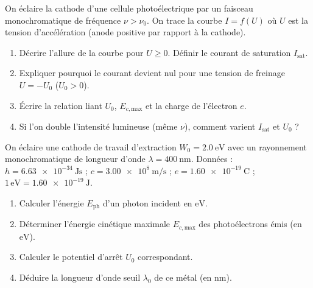 \documentclass[11pt]{article}
\begin{document}
\begin{exercice}[Caractéristique $I = f(U)$ d'une cellule photoélectrique]
On éclaire la cathode d'une cellule photoélectrique par un faisceau monochromatique de fréquence $\nu > \nu_0$. On trace la courbe $I = f(U)$ où $U$ est la tension d'accélération (anode positive par rapport à la cathode).
\begin{enumerate}
    \item Décrire l'allure de la courbe pour $U \ge 0$. Définir le courant de saturation $I_{\text{sat}}$.
    \item Expliquer pourquoi le courant devient nul pour une tension de freinage $U = -U_0$ ($U_0 > 0$).
    \item Écrire la relation liant $U_0$, $E_{c,\text{max}}$ et la charge de l'électron $e$.
    \item Si l'on double l'intensité lumineuse (même $\nu$), comment varient $I_{\text{sat}}$ et $U_0$ ?
\end{enumerate}
\end{exercice}

\begin{exercice}
On éclaire une cathode de travail d'extraction $W_0 = \SI{2,0}{\electronvolt}$ avec un rayonnement monochromatique de longueur d'onde $\lambda = \SI{400}{\nano\meter}$.
Données : $h = \SI{6,63e-34}{\joule\second}$ ; $c = \SI{3,00e8}{\meter\per\second}$ ; $e = \SI{1,60e-19}{\coulomb}$ ; $1\,\text{eV} = \SI{1,60e-19}{\joule}$.
\begin{enumerate}
    \item Calculer l'énergie $E_{\text{ph}}$ d'un photon incident en $\text{eV}$.
    \item Déterminer l'énergie cinétique maximale $E_{c,\text{max}}$ des photoélectrons émis (en $\text{eV}$).
    \item Calculer le potentiel d'arrêt $U_0$ correspondant.
    \item Déduire la longueur d'onde seuil $\lambda_0$ de ce métal (en $\text{nm}$).
\end{enumerate}
\end{exercice}
\end{document}
